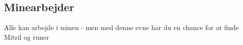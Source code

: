 \subsection*{Minearbejder}
Alle kan arbejde i minen - men med denne evne har du en chance for at finde Mitril og runer